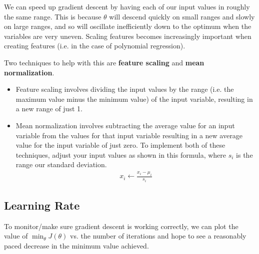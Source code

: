\documentclass{article}
\begin{document}
        We can speed up gradient descent by having each of our input values in roughly the same range. This is because 
        $\theta$ will descend quickly on small ranges and slowly on large ranges, and so will oscillate inefficiently
        down to the optimum when the variables are very uneven. Scaling features becomes increasingly important when 
        creating features (i.e. in the case of polynomial regression).
        \par
        Two techniques to help with this are \textbf{feature scaling} and \textbf{mean normalization}. 
        \begin{itemize}
            \item Feature scaling involves dividing the input values by the range (i.e. the maximum value minus the minimum value) of the input variable, 
                  resulting in a new range of just 1. 
            \item Mean normalization involves subtracting the average value for an input variable from the values for 
                  that input variable resulting in a new average value for the input variable 
                  of just zero. To implement both of these techniques, adjust your input values as shown in this formula, where $s_i$ is the range our
                  standard deviation.
            \begin{align*}
                x_i \longleftarrow \frac{x_i-\mu_i}{s_i}
            \end{align*}
        \end{itemize}

        \subsection{Learning Rate}

            To monitor/make sure gradient descent is working correctly, we can plot the value of $\min_{\theta}J(\theta)$ vs. 
            the number of iterations and hope to see a reasonably paced decrease in the minimum value achieved.
            \begin{center}
            \end{center}
        
\end{document}

